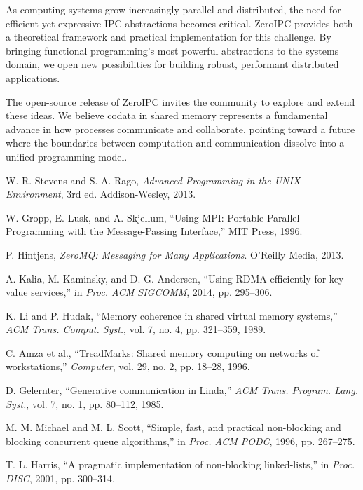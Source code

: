 \documentclass[10pt,conference]{IEEEtran}
\begin{document}
As computing systems grow increasingly parallel and distributed, the need for efficient yet expressive IPC abstractions becomes critical. ZeroIPC provides both a theoretical framework and practical implementation for this challenge. By bringing functional programming's most powerful abstractions to the systems domain, we open new possibilities for building robust, performant distributed applications.

The open-source release of ZeroIPC invites the community to explore and extend these ideas. We believe codata in shared memory represents a fundamental advance in how processes communicate and collaborate, pointing toward a future where the boundaries between computation and communication dissolve into a unified programming model.

\begin{thebibliography}{99}

W. R. Stevens and S. A. Rago, \emph{Advanced Programming in the UNIX Environment}, 3rd ed. Addison-Wesley, 2013.

W. Gropp, E. Lusk, and A. Skjellum, ``Using MPI: Portable Parallel Programming with the Message-Passing Interface,'' MIT Press, 1996.

P. Hintjens, \emph{ZeroMQ: Messaging for Many Applications}. O'Reilly Media, 2013.

A. Kalia, M. Kaminsky, and D. G. Andersen, ``Using RDMA efficiently for key-value services,'' in \emph{Proc. ACM SIGCOMM}, 2014, pp. 295--306.

K. Li and P. Hudak, ``Memory coherence in shared virtual memory systems,'' \emph{ACM Trans. Comput. Syst.}, vol. 7, no. 4, pp. 321--359, 1989.

C. Amza et al., ``TreadMarks: Shared memory computing on networks of workstations,'' \emph{Computer}, vol. 29, no. 2, pp. 18--28, 1996.

D. Gelernter, ``Generative communication in Linda,'' \emph{ACM Trans. Program. Lang. Syst.}, vol. 7, no. 1, pp. 80--112, 1985.

M. M. Michael and M. L. Scott, ``Simple, fast, and practical non-blocking and blocking concurrent queue algorithms,'' in \emph{Proc. ACM PODC}, 1996, pp. 267--275.

T. L. Harris, ``A pragmatic implementation of non-blocking linked-lists,'' in \emph{Proc. DISC}, 2001, pp. 300--314.


\end{thebibliography}
\end{document}
